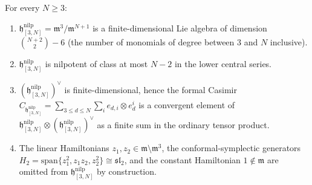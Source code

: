 \begin{lem}
\label{lem:trunc-is-nilpotent-lie}
For every $N\geq 3$:
\begin{enumerate}
  \item $\mathfrak h^{\mathrm{nilp}}_{[3,N]}=\mathfrak m^3/\mathfrak m^{N+1}$ is a
    finite-dimensional Lie algebra of dimension
    $\binom{N+2}{2}-6$ (the number of
    monomials of degree between $3$ and $N$ inclusive).
  \item $\mathfrak h^{\mathrm{nilp}}_{[3,N]}$ is nilpotent of class at most
    $N-2$ in the lower central series.
  \item $(\mathfrak h^{\mathrm{nilp}}_{[3,N]})^\vee$ is finite-dimensional, hence the
    formal Casimir
    $C_{\mathfrak h^{\mathrm{nilp}}_{[3,N]}}=\sum_{3\leq d\leq N}\sum_i
     e_{d,i}\otimes e_d^i$
    is a convergent element of
    $\mathfrak h^{\mathrm{nilp}}_{[3,N]}\otimes(\mathfrak h^{\mathrm{nilp}}_{[3,N]})^\vee$ as a finite
    sum in the ordinary tensor product.
  \item The linear Hamiltonians $z_1,z_2\in\mathfrak m\setminus
    \mathfrak m^3$, the conformal-symplectic generators
    $H_2=\mathrm{span}\{z_1^2,z_1z_2,z_2^2\}\cong\mathfrak{sl}_2$,
    and the constant Hamiltonian $1\notin\mathfrak m$ are omitted
    from $\mathfrak h^{\mathrm{nilp}}_{[3,N]}$ by construction.
\end{enumerate}
\end{lem}

